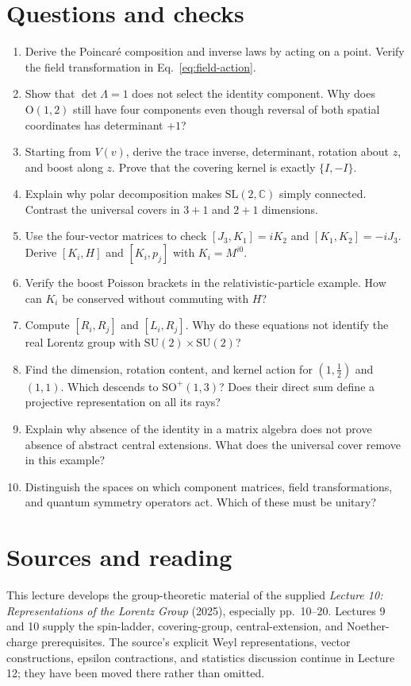 \documentclass[11pt]{article}
\newcommand{\SO}{\mathrm{SO}}
\newcommand{\OO}{\mathrm{O}}
\newcommand{\C}{\mathbb C}
\newcommand{\SU}{\mathrm{SU}}
\newcommand{\SL}{\mathrm{SL}}
\newcommand{\Lor}{\SO^+(1,3)}
\begin{document}
\section*{Questions and checks}
\begin{enumerate}
\item Derive the Poincar\'e composition and inverse laws by acting on a
point. Verify the field transformation in Eq.~\eqref{eq:field-action}.
\item Show that \(\det\Lambda=1\) does not select the identity component.
Why does \(\OO(1,2)\) still have four components even though reversal of
both spatial coordinates has determinant \(+1\)?
\item Starting from \(V(v)\), derive the trace inverse, determinant,
rotation about \(z\), and boost along \(z\). Prove that the covering
kernel is exactly \(\{I,-I\}\).
\item Explain why polar decomposition makes \(\SL(2,\C)\) simply
connected. Contrast the universal covers in \(3+1\) and \(2+1\) dimensions.
\item Use the four-vector matrices to check
\([J_3,K_1]=iK_2\) and \([K_1,K_2]=-iJ_3\).
Derive \([K_i,H]\) and \([K_i,p_j]\) with \(K_i=M^{i0}\).
\item Verify the boost Poisson brackets in the relativistic-particle
example. How can \(K_i\) be conserved without commuting with \(H\)?
\item Compute \([R_i,R_j]\) and \([L_i,R_j]\). Why do these equations
not identify the real Lorentz group with \(\SU(2)\times\SU(2)\)?
\item Find the dimension, rotation content, and kernel action for
\((1,\tfrac12)\) and \((1,1)\). Which descends to \(\Lor\)?
Does their direct sum define a projective representation on all its rays?
\item Explain why absence of the identity in a matrix algebra does not
prove absence of abstract central extensions. What does the universal
cover remove in this example?
\item Distinguish the spaces on which component matrices, field transformations,
and quantum symmetry operators act. Which of these must be unitary?
\end{enumerate}

\section*{Sources and reading}
This lecture develops the group-theoretic material of the supplied
\emph{Lecture 10: Representations of the Lorentz Group} (2025),
especially pp.\ 10--20. Lectures 9 and 10 supply the spin-ladder,
covering-group, central-extension, and Noether-charge prerequisites.
The source's explicit Weyl representations, vector constructions,
epsilon contractions, and statistics discussion continue in Lecture 12;
they have been moved there rather than omitted.
\end{document}
